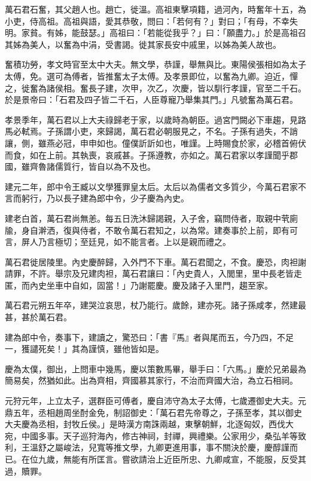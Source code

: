 
\begin{pinyinscope}
萬石君石奮，其父趙人也。趙亡，徙溫。高祖東擊項籍，過河內，時奮年十五，為小吏，侍高祖。高祖與語，愛其恭敬，問曰：「若何有？」對曰；「有母，不幸失明。家貧。有姊，能鼓瑟。」高祖曰：「若能從我乎？」曰：「願盡力。」於是高祖召其姊為美人，以奮為中涓，受書謁。徙其家長安中戚里，以姊為美人故也。

奮積功勞，孝文時官至太中大夫。無文學，恭謹，舉無與比。東陽侯張相如為太子太傅，免。選可為傅者，皆推奮太子太傅。及孝景即位，以奮為九卿。迫近，憚之，徙奮為諸侯相。奮長子建，次甲，次乙，次慶，皆以馴行孝謹，官至二千石。於是景帝曰：「石君及四子皆二千石，人臣尊寵乃舉集其門。」凡號奮為萬石君。

孝景季年，萬石君以上大夫祿歸老于家，以歲時為朝臣。過宮門闕必下車趨，見路馬必軾焉。子孫謂小吏，來歸謁，萬石君必朝服見之，不名。子孫有過失，不誚讓，側，雖燕必冠，申申如也。僮僕訢訢如也，唯謹。上時賜食於家，必稽首俯伏而食，如在上前。其執喪，哀戚甚。子孫遵教，亦如之。萬石君家以孝謹聞乎郡國，雖齊魯諸儒質行，皆自以為不及也。

建元二年，郎中令王臧以文學獲罪皇太后。太后以為儒者文多質少，今萬石君家不言而躬行，乃以長子建為郎中令，少子慶為內史。

建老白首，萬石君尚無恙。每五日洗沐歸謁親，入子舍，竊問侍者，取親中茕廁牏，身自澣洒，復與侍者，不敢令萬石君知之，以為常。建奏事於上前，即有可言，屏人乃言極切；至廷見，如不能言者。上以是親而禮之。

萬石君徙居陵里。內史慶醉歸，入外門不下車。萬石君聞之，不食。慶恐，肉袒謝請罪，不許。舉宗及兄建肉袒，萬石君讓曰：「內史貴人，入閭里，里中長老皆走匿，而內史坐車中自如，固當！」乃謝罷慶。慶及諸子入里門，趨至家。

萬石君元朔五年卒，建哭泣哀思，杖乃能行。歲餘，建亦死。諸子孫咸孝，然建最甚，甚於萬石君。

建為郎中令，奏事下，建讀之，驚恐曰：「書『馬』者與尾而五，今乃四，不足一，獲譴死矣！」其為謹慎，雖他皆如是。

慶為太僕，御出，上問車中幾馬，慶以策數馬畢，舉手曰：「六馬。」慶於兄弟最為簡易矣，然猶如此。出為齊相，齊國慕其家行，不治而齊國大治，為立石相祠。

元狩元年，上立太子，選群臣可傅者，慶自沛守為太子太傅，七歲遷御史大夫。元鼎五年，丞相趙周坐酎金免，制詔御史：「萬石君先帝尊之，子孫至孝，其以御史大夫慶為丞相，封牧丘侯。」是時漢方南誅兩越，東擊朝鮮，北逐匈奴，西伐大宛，中國多事。天子巡狩海內，修古神祠，封禪，興禮樂。公家用少，桑弘羊等致利，王溫舒之屬峻法，兒寬等推文學，九卿更進用事，事不關決於慶，慶醇謹而已。在位九歲，無能有所匡言。嘗欲請治上近臣所忠、九卿咸宣，不能服，反受其過，贖罪。


\end{pinyinscope}
